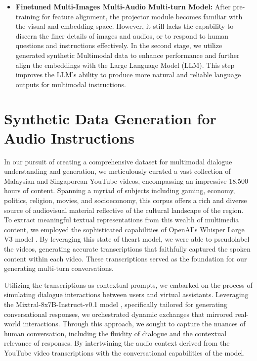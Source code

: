 \documentclass[preprint]{article}
\begin{document}
\begin{itemize}
  \item \textbf{Finetuned Multi-Images Multi-Audio Multi-turn Model:} After pre-training for feature alignment, the projector module becomes familiar with the visual and embedding space. However, it still lacks the capability to discern the finer details of images and audios, or to respond to human questions and instructions effectively. In the second stage, we utilize generated synthetic Multimodal data to enhance performance and further align the embeddings with the Large Language Model (LLM). This step improves the LLM's ability to produce more natural and reliable language outputs for multimodal instructions.

\end{itemize}

\section{Synthetic Data Generation for Audio Instructions}

In our pursuit of creating a comprehensive dataset for multimodal dialogue understanding and generation, we meticulously curated a vast collection of Malaysian and Singaporean YouTube videos, encompassing an impressive 18,500 hours of content. Spanning a myriad of subjects including gaming, economy, politics, religion, movies, and socioeconomy, this corpus offers a rich and diverse source of audiovisual material reflective of the cultural landscape of the region. To extract meaningful textual representations from this wealth of multimedia content, we employed the sophisticated capabilities of OpenAI's Whisper Large V3 model \cite{radford2022whisper}. By leveraging this state of theart model, we were able to pseudolabel the videos, generating accurate transcriptions that faithfully captured the spoken content within each video. These transcriptions served as the foundation for our generating multi-turn conversations.

Utilizing the transcriptions as contextual prompts, we embarked on the process of simulating dialogue interactions between users and virtual assistants. Leveraging the Mixtral-8x7B-Instruct-v0.1 model \cite{jiang2024mixtral}, specifically tailored for generating conversational responses, we orchestrated dynamic exchanges that mirrored real-world interactions. Through this approach, we sought to capture the nuances of human conversation, including the fluidity of dialogue and the contextual relevance of responses. By intertwining the audio context derived from the YouTube video transcriptions with the conversational capabilities of the model.
\end{document}
